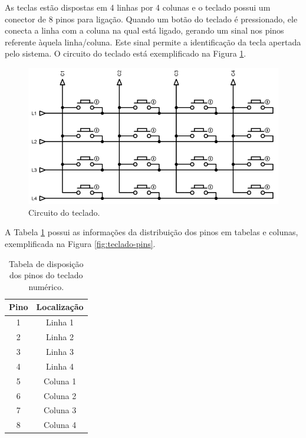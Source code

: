 As teclas estão dispostas em 4 linhas por 4 colunas e o teclado possui um conector de 8 pinos para ligação. Quando um botão do teclado é pressionado, ele conecta a linha com a coluna na qual está ligado, gerando um sinal nos pinos referente àquela linha/coluna. Este sinal permite a identificação da tecla apertada pelo sistema. O circuito do teclado está exemplificado na Figura \ref{fig:teclado-conexoes}.

\begin{figure}[htbp]
	\centering
	\includegraphics[scale=0.4]{figuras/matrix-1024x558.png}
	\caption{Circuito do teclado.}
	\label{fig:teclado-conexoes}
\end{figure}

A Tabela \ref{table:pinosteclado} possui as informações da distribuição dos pinos em tabelas e colunas, exemplificada na Figura \ref{fig:teclado-pins}.

\begin{table}[h!]
	\begin{center}
		\begin{tabular}{ |c|c| }
			\hline
			\rowcolor{lightgray} Pino & Localização \\
			 \hline 
				1 & Linha 1 \\
			 \hline 
				2 & Linha 2 \\
			 \hline 
				3 & Linha 3 \\
			 \hline 
				4 & Linha 4 \\
			 \hline 
				5 & Coluna 1 \\
			 \hline 
				6 & Coluna 2 \\
			 \hline 
				7 & Coluna 3 \\
			 \hline 
				8 & Coluna 4 \\
			\hline
		\end{tabular}
	\caption{Tabela de disposição dos pinos do teclado numérico.}
	\label{table:pinosteclado}
	\end{center}
\end{table}

